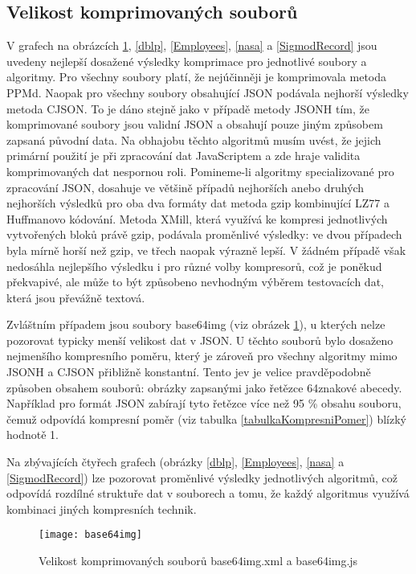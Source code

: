 \subsection{Velikost komprimovaných souborů}
V grafech na obrázcích \ref{base64img}, \ref{dblp}, \ref{Employees}, \ref{nasa} a \ref{SigmodRecord} jsou uvedeny nejlepší dosažené výsledky komprimace pro jednotlivé soubory a algoritmy. Pro všechny soubory platí, že nejúčinněji je komprimovala metoda PPMd. Naopak pro všechny soubory obsahující JSON podávala nejhorší výsledky metoda CJSON. To je dáno stejně jako v případě metody JSONH tím, že komprimované soubory jsou validní JSON a obsahují pouze jiným způsobem zapsaná původní data. Na obhajobu těchto algoritmů musím uvést, že jejich primární použití je při zpracování dat JavaScriptem a zde hraje validita komprimovaných dat nespornou roli. Pomineme-li algoritmy specializované pro zpracování JSON, dosahuje ve většině případů nejhorších anebo druhých nejhorších výsledků pro oba dva formáty dat metoda gzip kombinující LZ77 a Huffmanovo kódování. Metoda XMill, která využívá ke kompresi jednotlivých vytvořených bloků právě gzip, podávala proměnlivé výsledky: ve dvou případech byla mírně horší než gzip, ve třech naopak výrazně lepší. V žádném případě však nedosáhla nejlepšího výsledku i pro různé volby kompresorů, což je poněkud překvapivé, ale může to být způsobeno nevhodným výběrem testovacích dat, která jsou převážně textová.

Zvláštním případem jsou soubory base64img (viz obrázek \ref{base64img}), u kterých nelze pozorovat typicky menší velikost dat v JSON. U těchto souborů bylo dosaženo nejmenšího kompresního poměru, který je zároveň pro všechny algoritmy mimo JSONH a CJSON přibližně konstantní. Tento jev je velice pravděpodobně způsoben obsahem souborů: obrázky zapsanými jako řetězce 64znakové abecedy. Například pro formát JSON zabírají tyto řetězce více než 95 \% obsahu souboru, čemuž odpovídá kompresní poměr (viz tabulka \ref{tabulkaKompresniPomer}) blízký hodnotě 1.

Na zbývajících čtyřech grafech (obrázky \ref{dblp}, \ref{Employees}, \ref{nasa} a \ref{SigmodRecord}) lze pozorovat proměnlivé výsledky jednotlivých algoritmů, což odpovídá rozdílné struktuře dat v souborech a tomu, že každý algoritmus využívá kombinaci jiných kompresních technik.

\begin{figure}[!h]
\centering
\texttt{[image: base64img]}
\caption{Velikost komprimovaných souborů base64img.xml a base64img.js}
\label{base64img}
\end{figure}


